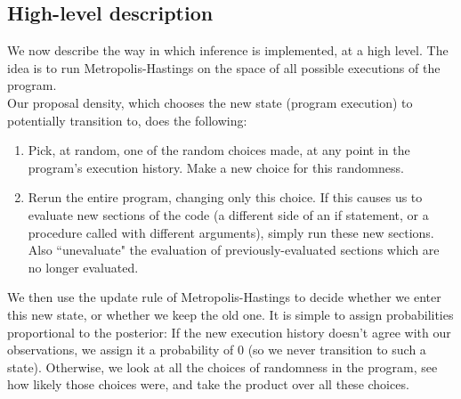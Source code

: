 \documentclass[11pt]{article}
\begin{document}



%



\subsection{High-level description}

We now describe the way in which inference is implemented, at a high level.   The idea is to run Metropolis-Hastings on the space of all possible executions of the program.  \\

Our proposal density, which chooses the new state (program execution) to potentially transition to, does the following:   
\begin{enumerate}
\item Pick, at random, one of the random choices made, at any point in the program's execution history.  Make a new choice for this randomness.  
\item Rerun the entire program, changing only this choice.  If this causes us to evaluate new sections of the code (a different side of an if statement, or a procedure called with different arguments), simply run these new sections.  
Also ``unevaluate" the evaluation of previously-evaluated sections which are no longer evaluated.   
\end{enumerate}

We then use the update rule of Metropolis-Hastings to decide whether we enter this new state, or whether we keep the old one.  It is simple to assign probabilities proportional to the posterior:  If the new execution history doesn't agree with our observations, we assign it a probability of 0 (so we never transition to such a state).  Otherwise, we look at all the choices of randomness in the program, see how likely those choices were, and take the product over all these choices.   
\end{document}
